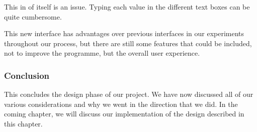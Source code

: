 This in of itself is an issue.
Typing each value in the different text boxes can be quite cumbersome.

This new interface has advantages over previous interfaces in our experiments throughout our process, but there are still some features that could be included, not to improve the programme, but the overall user experience.

\subsubsection*{Conclusion}
This concludes the design phase of our project. We have now discussed all of our various considerations and why we went in the direction that we did. In the coming chapter, we will discuss our implementation of the design described in this chapter.


